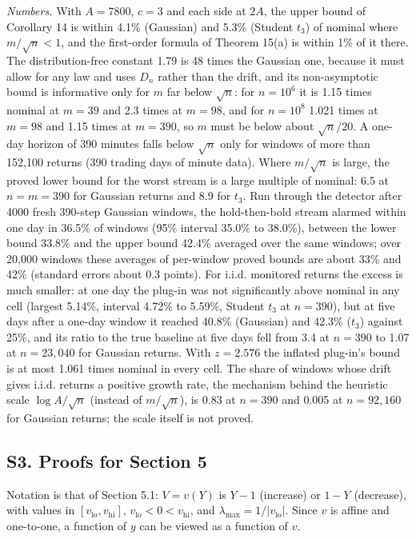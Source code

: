 \documentclass[
]{article}
\begin{document}
\emph{Numbers.} With \(A = 7800\), \(c = 3\) and each side at \(2A\),
the upper bound of Corollary 14 is within 4.1\% (Gaussian) and 5.3\%
(Student \(t_3\)) of nominal where \(m/\sqrt n < 1\), and the
first-order formula of Theorem 15(a) is within 1\% of it there. The
distribution-free constant 1.79 is 48 times the Gaussian one, because it
must allow for any law and uses \(D_n\) rather than the drift, and its
non-asymptotic bound is informative only for \(m\) far below
\(\sqrt n\): for \(n = 10^6\) it is 1.15 times nominal at \(m = 39\) and
2.3 times at \(m = 98\), and for \(n = 10^8\) 1.021 times at \(m = 98\)
and 1.15 times at \(m = 390\), so \(m\) must be below about
\(\sqrt n/20\). A one-day horizon of 390 minutes falls below \(\sqrt n\)
only for windows of more than 152,100 returns (390 trading days of
minute data). Where \(m/\sqrt n\) is large, the proved lower bound for
the worst stream is a large multiple of nominal: 6.5 at \(n = m = 390\)
for Gaussian returns and 8.9 for \(t_3\). Run through the detector after
4000 fresh 390-step Gaussian windows, the hold-then-bold stream alarmed
within one day in 36.5\% of windows (95\% interval 35.0\% to 38.0\%),
between the lower bound 33.8\% and the upper bound 42.4\% averaged over
the same windows; over 20,000 windows these averages of per-window
proved bounds are about 33\% and 42\% (standard errors about 0.3
points). For i.i.d. monitored returns the excess is much smaller: at one
day the plug-in was not significantly above nominal in any cell (largest
5.14\%, interval 4.72\% to 5.59\%, Student \(t_3\) at \(n = 390\)), but
at five days after a one-day window it reached 40.8\% (Gaussian) and
42.3\% (\(t_3\)) against 25\%, and its ratio to the true baseline at
five days fell from 3.4 at \(n = 390\) to 1.07 at \(n = 23{,}040\) for
Gaussian returns. With \(z = 2.576\) the inflated plug-in's bound is at
most 1.061 times nominal in every cell. The share of windows whose drift
gives i.i.d. returns a positive growth rate, the mechanism behind the
heuristic scale \(\log A/\sqrt n\) (instead of \(m/\sqrt n\)), is 0.83
at \(n = 390\) and 0.005 at \(n = 92{,}160\) for Gaussian returns; the
scale itself is not proved.

\hypertarget{s3.-proofs-for-section-5}{%
\subsection{S3. Proofs for Section 5}\label{s3.-proofs-for-section-5}}

Notation is that of Section 5.1: \(V = v(Y)\) is \(Y - 1\) (increase) or
\(1 - Y\) (decrease), with values in
\([v_{\mathrm{lo}}, v_{\mathrm{hi}}]\),
\(v_{\mathrm{lo}} < 0 < v_{\mathrm{hi}}\), and
\(\lambda_{\max} = 1/\lvert v_{\mathrm{lo}}\rvert\). Since \(v\) is
affine and one-to-one, a function of \(y\) can be viewed as a function
of \(v\).
\end{document}
